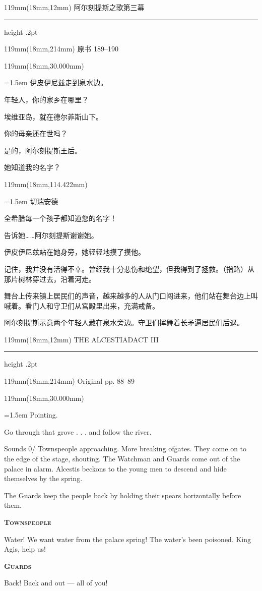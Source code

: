 \documentclass{article}
\newcommand{\ENsetup}{\normalfont\color{ink}\fontsize{11}{16.5}\selectfont\emergencystretch=1.5em}
\newcommand{\ZHsetup}{\normalfont\color{ink}\fontsize{10.5}{17}\selectfont\emergencystretch=1.5em}
\newcommand{\ENspeaker}[1]{{\fontsize{9.8}{13}\selectfont\scshape\bfseries #1}\par\vspace{3pt}}
\newcommand{\ZHspeaker}[1]{{\hei\fontsize{10.3}{13}\selectfont #1}\par\vspace{3pt}}
\newcommand{\Block}[3]{\begin{textblock*}{119mm}(18mm,#1mm){#2 #3\par}\end{textblock*}}
\newcommand{\Heading}[3]{%
  \begin{textblock*}{119mm}(18mm,12mm)
    \color{quiet}\fontsize{7.5}{10}\selectfont
    #1\hfill #2\par\vspace{3mm}\hrule height .2pt
  \end{textblock*}
  \begin{textblock*}{119mm}(18mm,214mm)
    \color{quiet}\fontsize{7}{10}\selectfont #3\hfill\thepage
  \end{textblock*}
}
\begin{document}
\newpage
\null
\Heading{阿尔刻提斯之歌}{第三幕}{原书 189–190}
\Block{30.000}{\ZHsetup}{\kai 伊皮伊尼兹走到泉水边。\par \vspace{2.2mm}\ZHspeaker{阿尔刻提斯}年轻人，你的家乡在哪里？\par \vspace{2.2mm}\ZHspeaker{切瑞安德}埃维亚岛，就在德尔菲斯山下。\par \vspace{2.2mm}\ZHspeaker{阿尔刻提斯}你的母亲还在世吗？\par \vspace{2.2mm}\ZHspeaker{切瑞安德}是的，阿尔刻提斯王后。\par \vspace{2.2mm}\ZHspeaker{阿尔刻提斯}她知道我的名字？\par }
\Block{114.422}{\ZHsetup}{\ZHspeaker{切瑞安德}全希腊每一个孩子都知道您的名字！\par \vspace{2.2mm}\ZHspeaker{阿尔刻提斯}告诉她……阿尔刻提斯谢谢她。\par \vspace{2.2mm}\kai 伊皮伊尼兹站在她身旁，她轻轻地摸了摸他。\par \vspace{2.2mm}\ZHspeaker{阿尔刻提斯}记住，我并没有活得不幸。曾经我十分悲伤和绝望，但我得到了拯救。{\kai （指路）}从那片树林穿过去，沿着河走。\par \vspace{2.2mm}\kai 舞台上传来镇上居民们的声音，越来越多的人从门口闯进来，他们站在舞台边上叫喊着。看门人和守卫们从宫殿里出来，充满戒备。\par \vspace{2.2mm}\kai 阿尔刻提斯示意两个年轻人藏在泉水旁边。守卫们挥舞着长矛逼居民们后退。\par }
\newpage
\null
\Heading{THE ALCESTIAD}{ACT III}{Original pp. 88–89}
\Block{30.000}{\ENsetup}{\sloppy
Pointing.\par\vspace{2pt}
Go through that grove . . . and follow the river.\par\vspace{2pt}
Sounds 0/ Townspeople approaching. More breaking ofgates. They come on to the edge of the stage, shouting. The Watchman and Guards come out of the palace in alarm. Alcestis beckons to the young men to descend and hide themselves by the spring.\par\vspace{2pt}
The Guards keep the people back by holding their spears horizontally before them.\par\vspace{2pt}
\ENspeaker{Townspeople}
Water! We want water from the palace spring! The water's been poisoned. King Agis, help us!\par\vspace{2pt}
\ENspeaker{Guards}
Back! Back and out — all of you!\par\vspace{2pt}}
\end{document}
